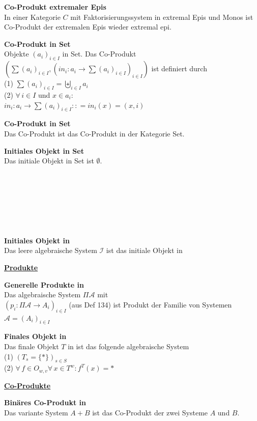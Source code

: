 \begin{multicols}{2}
\textbf{ Co-Produkt extremaler Epis} \\
In einer Kategorie $C$ mit Faktorisierungssystem in extremal Epis und Monos ist Co-Produkt der extremalen Epis wieder extremal epi.

\textbf{ Co-Produkt in Set} \\
Objekte $(a_i)_{i \in I}$ in Set. Das Co-Produkt $\left(\sum(a_{i})_{i\in I},\left(in_{i}:a_{i} \rightarrow \sum (a_{i})_{i\in I}\right)_{i\in I}\right)$ ist definiert durch \\
(1) $\sum(a_{i})_{i\in I}=\biguplus_{i \in I} a_i$\\
(2) $\forall \, i\in I$ und $x\in a_{i} $: \\ $in_i: a_i \rightarrow \sum(a_i)_{i \in I} :: = in_i(x) = (x,i)$

\textbf{ Co-Produkt in Set} \\
Das Co-Produkt ist das Co-Produkt in der Kategorie Set.


\textbf{ Initiales Objekt in Set} \\
Das initiale Objekt in Set ist $\emptyset$.
\\
\\
\\
\\
\\
\\
\\
\\
\textbf{ Initiales Objekt in \syssig} \\
Das leere algebraische System $\mathcal{I}$ ist das initiale Objekt in \syssig



\end{multicols}



\begin{multicols}{2}

\textbf{\underline{Produkte}} 

\textbf{ Generelle Produkte in \syssig} \\
Das algebraische System $\Pi \mathcal{A}$ mit \\ $(p_i: \Pi \mathcal{A} \rightarrow A_i)_{i \in I}$ (aus Def 134) ist Produkt der Familie von Systemen $\mathcal{A} = (A_i)_{i \in I}$


\textbf{ Finales Objekt in \syssig} \\
Das finale Objekt $T$ in \syssig ist das folgende algebraische System \\
(1) $(T_s = \{*\})_{s \in S}$ \\
(2) $\forall \, f \in O_{w,v} \forall \, x \in T^w: f^T(x)=*$

\columnbreak

\textbf{\underline{Co-Produkte}} 

\textbf{ Binäres Co-Produkt in \syssig} \\
Das variante System $A + B$ ist das Co-Produkt der zwei Systeme $A$ und $B$.

\end{multicols}



